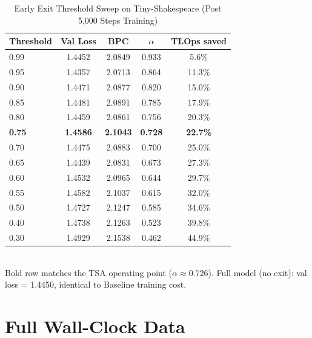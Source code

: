\documentclass{article}
\newcommand{\tsa}{TSA\xspace}
\begin{document}
\begin{table}[H]
\centering
\caption{Early Exit Threshold Sweep on Tiny-Shakespeare (Post 5{,}000 Steps Training)}
\label{tab:ee_full}
\small
\begin{tabular}{lcccc}
\toprule
Threshold & Val Loss & BPC & $\alpha$ & TLOps saved \\
\midrule
0.99 & 1.4452 & 2.0849 & 0.933 & 5.6\% \\
0.95 & 1.4357 & 2.0713 & 0.864 & 11.3\% \\
0.90 & 1.4471 & 2.0877 & 0.820 & 15.0\% \\
0.85 & 1.4481 & 2.0891 & 0.785 & 17.9\% \\
0.80 & 1.4459 & 2.0861 & 0.756 & 20.3\% \\
\textbf{0.75} & \textbf{1.4586} & \textbf{2.1043} & \textbf{0.728} & \textbf{22.7\%} \\
0.70 & 1.4475 & 2.0883 & 0.700 & 25.0\% \\
0.65 & 1.4439 & 2.0831 & 0.673 & 27.3\% \\
0.60 & 1.4532 & 2.0965 & 0.644 & 29.7\% \\
0.55 & 1.4582 & 2.1037 & 0.615 & 32.0\% \\
0.50 & 1.4727 & 2.1247 & 0.585 & 34.6\% \\
0.40 & 1.4738 & 2.1263 & 0.523 & 39.8\% \\
0.30 & 1.4929 & 2.1538 & 0.462 & 44.9\% \\
\bottomrule
\end{tabular}
\\[3pt]
{\footnotesize Bold row matches the \tsa operating point ($\alpha \approx 0.726$).
Full model (no exit): val loss = 1.4450, identical to Baseline training cost.}
\end{table}

\section{Full Wall-Clock Data}
\label{app:wallclock}
\end{document}
